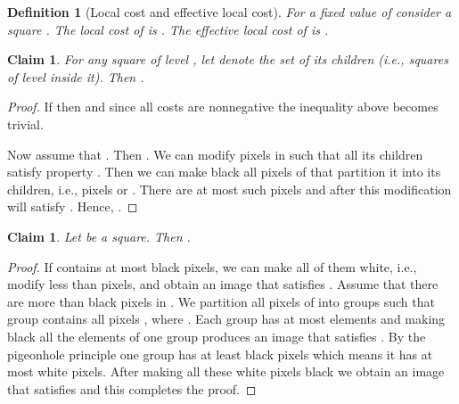 \documentclass[11pt,english]{article}
\newtheorem{claim}[theorem]{Claim}
\newtheorem{definition}{Definition}[section]
\numberwithin{figure}{section}
\begin{document}
\begin{definition}[Local cost and effective local cost]
For a fixed value of  consider a square .
The \emph{local cost} of  is . The \emph{effective local cost} of  is
.
\end{definition}
\begin{claim}
\label{cl:parent_children_cost_relation}
For any square  of level , let  denote the set of its  children (i.e.,
squares of level  inside it).
Then .
\end{claim}
\begin{proof}
If  then  and since all costs are nonnegative
the inequality above becomes trivial.

Now assume that . Then . We can modify
 pixels in  such that all its children
satisfy property . Then we can make black all pixels of  that
partition it into its children, i.e., pixels  or . There are at most  such
pixels and after this modification  will satisfy . Hence,
.
\end{proof}
\begin{claim}
\label{cl:max_dist_to_border_connectedness}
Let  be a  square. Then .
\end{claim}
\begin{proof}
 If  contains at most  black pixels, we can make all of them white, i.e.,
 modify less than  pixels, and obtain an image that satisfies .
 Assume that there are more than   black pixels in . We partition all
 pixels of  into  groups such that group  contains all pixels , where . Each group has at most  elements and making black all the elements of one group produces an image that satisfies . By the pigeonhole principle one group has at least  black pixels which means it has at most  white pixels. After making all these white pixels black we obtain an image that satisfies  and this completes the proof.
\end{proof}
\end{document}
